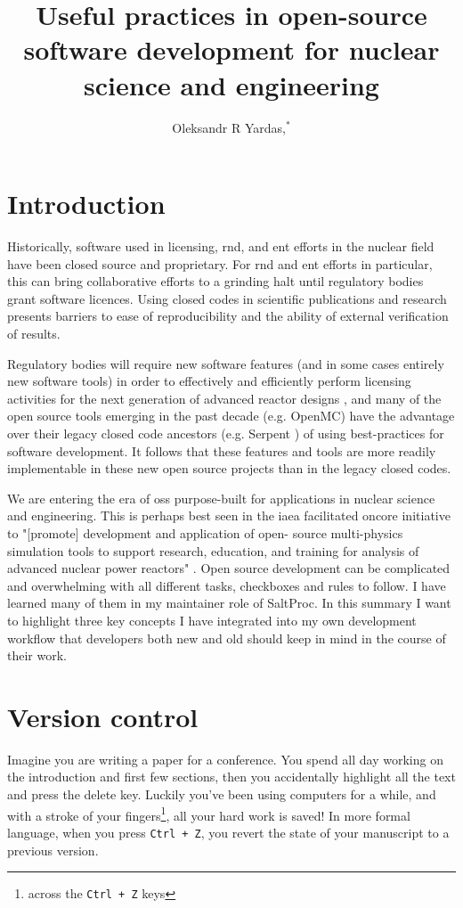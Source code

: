 \documentclass{anstrans}
\title{Useful practices in open-source software development for nuclear science and engineering}
\author{Oleksandr R Yardas,$^{*}$}
\institute{
$^{*}$Advanced Reactors and Fuel Cycles, University of Illinois - Urbana Champaign.
Champaign, IL, oyardas2@illinois.edu
}
\begin{document}
\section{Introduction}
    Historically, software used in licensing, \Gls{rnd}, and \Gls{ent} efforts in the nuclear field have been closed source and proprietary. For \Gls{rnd} and \Gls{ent} efforts in particular, this can bring collaborative efforts to a grinding halt until regulatory bodies grant software licences. Using closed codes in scientific publications and research presents barriers to ease of reproducibility and the ability of external verification of results.
    
    Regulatory bodies will require new software features (and in some cases entirely new software tools) in order to effectively and efficiently perform licensing activities for the next generation of advanced reactor designs \cite{usnrc_nonlwr_2020-1}, and many of the open source tools emerging in the past decade (e.g. OpenMC\cite{romano_openmc_2015}) have the advantage over their legacy closed code ancestors (e.g. Serpent \cite{leppanen_serpent_2014}) of using best-practices for software development. It follows that these features and tools are more readily implementable in these new open source projects than in the legacy closed codes.
    
    We are entering the era of \Gls{oss} purpose-built for applications in nuclear science and engineering. This is perhaps best seen in the \Gls{iaea} facilitated \Gls{oncore} initiative \cite{fiorina_initiative_2021} to "[promote] development and application of open- source multi-physics simulation tools to support research, education, and training for analysis of advanced nuclear power reactors"  \cite{iaea_open-source_2022}. Open source development can be complicated and overwhelming with all
    different tasks, checkboxes and rules to follow. I have learned many of them in my maintainer role of SaltProc\cite{rykhlevskii_arfcsaltproc_2018}. In this summary I want to highlight three key concepts I have integrated into my own development workflow that developers both new and old should keep in mind in the course of their work. 

\section{Version control}
    Imagine you are writing a paper for a conference. You spend all day working on the introduction and first few sections, then you accidentally highlight all the text and press the delete key. Luckily you've been using computers for a while, and with a stroke of your fingers\footnote{across the \verb.Ctrl + Z. keys}, all your hard work is saved! In more formal language, when you press \verb.Ctrl + Z., you revert the state of your manuscript to a previous version.
    
\end{document}
